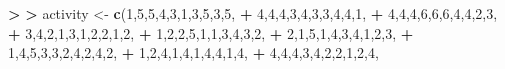 \documentclass[]{article}
\newenvironment{Shaded}{\begin{snugshade}}{\end{snugshade}}
\newcommand{\KeywordTok}[1]{\textcolor[rgb]{0.13,0.29,0.53}{\textbf{#1}}}
\newcommand{\DecValTok}[1]{\textcolor[rgb]{0.00,0.00,0.81}{#1}}
\newcommand{\StringTok}[1]{\textcolor[rgb]{0.31,0.60,0.02}{#1}}
\newcommand{\OperatorTok}[1]{\textcolor[rgb]{0.81,0.36,0.00}{\textbf{#1}}}
\newcommand{\ErrorTok}[1]{\textcolor[rgb]{0.64,0.00,0.00}{\textbf{#1}}}
\newcommand{\NormalTok}[1]{#1}
\begin{document}
\begin{Shaded}
\begin{Highlighting}[]
\ErrorTok{>}\StringTok{ }
\ErrorTok{>}\StringTok{ }\NormalTok{activity <-}\StringTok{      }\KeywordTok{c}\NormalTok{(}\DecValTok{1}\NormalTok{,}\DecValTok{5}\NormalTok{,}\DecValTok{5}\NormalTok{,}\DecValTok{4}\NormalTok{,}\DecValTok{3}\NormalTok{,}\DecValTok{1}\NormalTok{,}\DecValTok{3}\NormalTok{,}\DecValTok{5}\NormalTok{,}\DecValTok{3}\NormalTok{,}\DecValTok{5}\NormalTok{,}
\OperatorTok{+}\StringTok{                    }\DecValTok{4}\NormalTok{,}\DecValTok{4}\NormalTok{,}\DecValTok{4}\NormalTok{,}\DecValTok{3}\NormalTok{,}\DecValTok{4}\NormalTok{,}\DecValTok{3}\NormalTok{,}\DecValTok{3}\NormalTok{,}\DecValTok{4}\NormalTok{,}\DecValTok{4}\NormalTok{,}\DecValTok{1}\NormalTok{,}
\OperatorTok{+}\StringTok{                    }\DecValTok{4}\NormalTok{,}\DecValTok{4}\NormalTok{,}\DecValTok{4}\NormalTok{,}\DecValTok{6}\NormalTok{,}\DecValTok{6}\NormalTok{,}\DecValTok{6}\NormalTok{,}\DecValTok{4}\NormalTok{,}\DecValTok{4}\NormalTok{,}\DecValTok{2}\NormalTok{,}\DecValTok{3}\NormalTok{,}
\OperatorTok{+}\StringTok{                    }\DecValTok{3}\NormalTok{,}\DecValTok{4}\NormalTok{,}\DecValTok{2}\NormalTok{,}\DecValTok{1}\NormalTok{,}\DecValTok{3}\NormalTok{,}\DecValTok{1}\NormalTok{,}\DecValTok{2}\NormalTok{,}\DecValTok{2}\NormalTok{,}\DecValTok{1}\NormalTok{,}\DecValTok{2}\NormalTok{,}
\OperatorTok{+}\StringTok{                    }\DecValTok{1}\NormalTok{,}\DecValTok{2}\NormalTok{,}\DecValTok{2}\NormalTok{,}\DecValTok{5}\NormalTok{,}\DecValTok{1}\NormalTok{,}\DecValTok{1}\NormalTok{,}\DecValTok{3}\NormalTok{,}\DecValTok{4}\NormalTok{,}\DecValTok{3}\NormalTok{,}\DecValTok{2}\NormalTok{,}
\OperatorTok{+}\StringTok{                    }\DecValTok{2}\NormalTok{,}\DecValTok{1}\NormalTok{,}\DecValTok{5}\NormalTok{,}\DecValTok{1}\NormalTok{,}\DecValTok{4}\NormalTok{,}\DecValTok{3}\NormalTok{,}\DecValTok{4}\NormalTok{,}\DecValTok{1}\NormalTok{,}\DecValTok{2}\NormalTok{,}\DecValTok{3}\NormalTok{,}
\OperatorTok{+}\StringTok{                    }\DecValTok{1}\NormalTok{,}\DecValTok{4}\NormalTok{,}\DecValTok{5}\NormalTok{,}\DecValTok{3}\NormalTok{,}\DecValTok{3}\NormalTok{,}\DecValTok{2}\NormalTok{,}\DecValTok{4}\NormalTok{,}\DecValTok{2}\NormalTok{,}\DecValTok{4}\NormalTok{,}\DecValTok{2}\NormalTok{,}
\OperatorTok{+}\StringTok{                    }\DecValTok{1}\NormalTok{,}\DecValTok{2}\NormalTok{,}\DecValTok{4}\NormalTok{,}\DecValTok{1}\NormalTok{,}\DecValTok{4}\NormalTok{,}\DecValTok{1}\NormalTok{,}\DecValTok{4}\NormalTok{,}\DecValTok{4}\NormalTok{,}\DecValTok{1}\NormalTok{,}\DecValTok{4}\NormalTok{,}
\OperatorTok{+}\StringTok{                    }\DecValTok{4}\NormalTok{,}\DecValTok{4}\NormalTok{,}\DecValTok{4}\NormalTok{,}\DecValTok{3}\NormalTok{,}\DecValTok{4}\NormalTok{,}\DecValTok{2}\NormalTok{,}\DecValTok{2}\NormalTok{,}\DecValTok{1}\NormalTok{,}\DecValTok{2}\NormalTok{,}\DecValTok{4}\NormalTok{,}

\end{Highlighting}
\end{Shaded}
\end{document}
